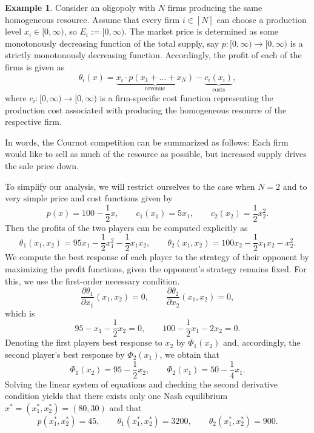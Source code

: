 \documentclass[a4paper,11pt,reqno,english]{amsart}
\theoremstyle{plain}
\theoremstyle{definition}
\newtheorem{example}[theorem]{Example}
\begin{document}
\begin{example}\label{ex:CournotCompetition}
	Consider an oligopoly with $N$ firms producing the same homogeneous resource. Assume that every firm $i\in [N]$ can choose a production level $x_i\in [0,\infty)$, so $E_i:=[0,\infty)$. The market price is determined as some monotonously decreasing function of the total supply, say $p\colon [0,\infty)\longrightarrow[0,\infty)$ is a strictly monotonously decreasing function. Accordingly, the profit of each of the firms is given as
	\begin{displaymath}
		\theta_i(x) = \underbrace{x_i\cdot p(x_1+\dots+x_N)}_{\text{revenue}} - \underbrace{c_i(x_i)}_{\text{costs}},
	\end{displaymath}
	where $c_i\colon [0,\infty)\longrightarrow [0,\infty)$ is a firm-specific cost function representing the production cost associated with producing the homogeneous resource of the respective firm.

	\medskip
	In words, the Cournot competition can be summarized as follows: Each firm would like to sell as much of the resource as possible, but increased supply drives the sale price down.

	\medskip
	To simplify our analysis, we will restrict ourselves to the case when $N=2$ and to very simple price and cost functions given by
	\begin{displaymath}
		p(x) = 100 - \frac{1}{2}x, \qquad c_1(x_1) = 5x_1, \qquad c_2(x_2) = \frac{1}{2}x_2^2.
	\end{displaymath}
	Then the profits of the two players can be computed explicitly as
	\begin{displaymath}
		\theta_1(x_1,x_2)  = 95x_1 - \frac{1}{2}x_1^2 - \frac{1}{2}x_1x_2, \qquad	\theta_2(x_1,x_2) = 100x_2  - \frac{1}{2}x_1x_2 - x_2^2.
	\end{displaymath}
	We compute the best response of each player to the strategy of their opponent by maximizing the profit functions, given the opponent's strategy remains fixed. For this, we use the first-order necessary condition.
	\begin{displaymath}
		\frac{\partial\theta_1}{\partial x_1}(x_1,x_2)=0,\qquad \frac{\partial\theta_2}{\partial x_2}(x_1,x_2)=0,
	\end{displaymath}
	which is
	\begin{displaymath}
		95 - x_1 - \frac{1}{2}x_2=0,\qquad 100 - \frac{1}{2}x_1 - 2x_2=0.
	\end{displaymath}
	Denoting the first players best response to $x_2$ by $\Phi_1(x_2)$ and, accordingly, the second player's best response by $\Phi_2(x_1)$, we obtain that
	\begin{displaymath}
		\Phi_1(x_2) = 95 - \frac{1}{2}x_2, \qquad \Phi_2(x_1) = 50 - \frac{1}{4}x_1.
	\end{displaymath}
	Solving the linear system of equations and checking the second derivative condition yields that there exists only one Nash equilibrium $x^*=(x_1^*,x_2^*)=(80,30)$ and that
	\begin{displaymath}
		p(x_1^*,x_2^*)  = 45,   \qquad \theta_1(x_1^*,x_2^*)  = 3200, \qquad \theta_2(x_1^*,x_2^*) = 900.
	\end{displaymath}


\end{example}
\end{document}
